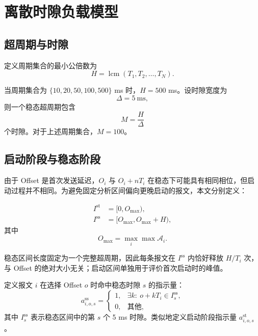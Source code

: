 \documentclass[UTF8,12pt,a4paper]{ctexart}
\DeclareMathOperator{\lcm}{lcm}
\newcommand{\Oset}{\mathcal{A}}
\begin{document}
\section{离散时隙负载模型}

\subsection{超周期与时隙}

定义周期集合的最小公倍数为
\begin{equation}
 H=\lcm(T_1,T_2,\ldots,T_N).
\label{eq:hyperperiod}
\end{equation}

当周期集合为 $\{10,20,50,100,500\}$ ms 时，$H=500$ ms。设时隙宽度为
\begin{equation}
 \Delta=5\ \mathrm{ms},
\end{equation}
则一个稳态超周期包含
\begin{equation}
 M=\frac{H}{\Delta}
\end{equation}
个时隙。对于上述周期集合，$M=100$。

\subsection{启动阶段与稳态阶段}

由于 Offset 是首次发送延迟，$O_i$ 与 $O_i+nT_i$ 在稳态下可能具有相同相位，但启动过程并不相同。为避免固定分析区间偏向更晚启动的报文，本文分别定义：

\begin{align}
 I^{\mathrm{st}}&=[0,O_{\max}),\\
 I^{\mathrm{ss}}&=[O_{\max},O_{\max}+H),
\end{align}
其中
\begin{equation}
 O_{\max}=\max_i\max \Oset_i.
\end{equation}

稳态区间长度固定为一个完整超周期，因此每条报文在 $I^{\mathrm{ss}}$ 内恰好释放 $H/T_i$ 次，与 Offset 的绝对大小无关；启动区间单独用于评价首次启动时的峰值。

定义报文 $i$ 在选择 Offset $o$ 时命中稳态时隙 $s$ 的指示量：
\begin{equation}
 a^{\mathrm{ss}}_{i,o,s}=
 \begin{cases}
 1, & \exists k:\ o+kT_i\in I^{\mathrm{ss}}_s,\\
 0, & \text{其他},
 \end{cases}
\label{eq:indicator-ss}
\end{equation}
其中 $I^{\mathrm{ss}}_s$ 表示稳态区间中的第 $s$ 个 5 ms 时隙。类似地定义启动阶段指示量 $a^{\mathrm{st}}_{i,o,s}$。
\end{document}
